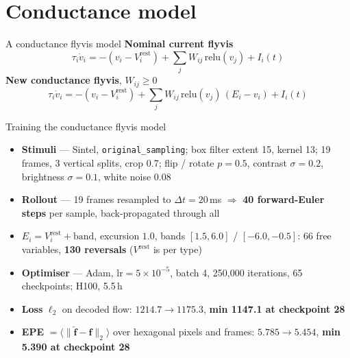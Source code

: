 \documentclass[aspectratio=169]{beamer}
\begin{document}
\section{Conductance model}
\begin{frame}{A conductance flyvis model}
\vfill
{\small\textbf{Nominal current flyvis}}
\[ \tau_i \dot v_i = -(v_i - V^{\mathrm{rest}}_i) + \sum_j W_{ij}\,\mathrm{relu}(v_j) + I_i(t) \]
\vfill
{\small\textbf{New conductance flyvis}, $W_{ij}\ge 0$}
\[ \tau_i \dot v_i = -(v_i - V^{\mathrm{rest}}_i) + \sum_j W_{ij}\,\mathrm{relu}(v_j)\,(E_i - v_i) + I_i(t) \]
\vfill
\end{frame}

\begin{frame}{Training the conductance flyvis model}
\vspace{0.45cm}
\scriptsize
\setlength{\itemsep}{1pt}
\begin{itemize}\itemsep1pt
\item \textbf{Stimuli} --- Sintel, \texttt{original\_sampling}; box filter extent 15,
      kernel 13; 19 frames, 3 vertical splits, crop 0.7; flip / rotate $p=0.5$,
      contrast $\sigma\!=\!0.2$, brightness $\sigma\!=\!0.1$, white noise $0.08$
\item \textbf{Rollout} --- 19 frames resampled to $\Delta t = 20$\,ms
      $\Rightarrow$ \textbf{40 forward-Euler steps} per sample, back-propagated through all
\item \textbf{$E_i = V^{\mathrm{rest}}_i + \mathrm{band}$}, excursion $1.0$, bands
      $[1.5, 6.0]$ / $[-6.0, -0.5]$: 66 free variables, \textbf{130 reversals} ($V^{\mathrm{rest}}$ is per type)
\item \textbf{Optimiser} --- Adam, $\mathrm{lr} = 5\times10^{-5}$, batch 4,
      250{,}000 iterations, 65 checkpoints; H100, 5.5\,h
\item \textbf{Loss} $\ell_2$ on decoded flow: $1214.7 \rightarrow 1175.3$,
      \textbf{min 1147.1 at checkpoint 28}
\item \textbf{EPE} $= \big\langle \lVert \hat{\mathbf{f}} - \mathbf{f} \rVert_2 \big\rangle$
      over hexagonal pixels and frames: $5.785 \rightarrow 5.454$,
      \textbf{min 5.390 at checkpoint 28}
\end{itemize}
\vspace{1pt}
\begin{center}

\end{center}
\end{frame}
\end{document}
